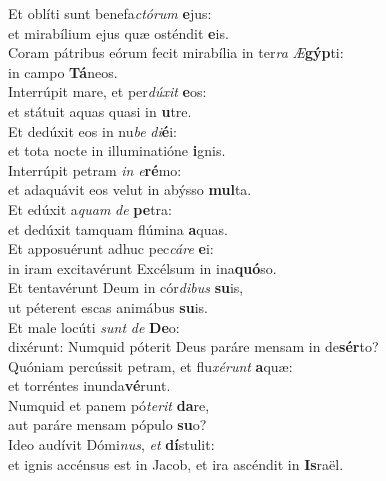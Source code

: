 \evenverse Et oblíti sunt benefa\textit{ctó}\textit{rum} \textbf{e}jus:~\*\\
\evenverse et mirabílium ejus quæ osténdit \textbf{e}is.\\
\oddverse Coram pátribus eórum fecit mirabília in ter\textit{ra} \textit{Æ}\textbf{gýp}ti:~\*\\
\oddverse in campo \textbf{Tá}neos.\\
\evenverse Interrúpit mare, et per\textit{dú}\textit{xit} \textbf{e}os:~\*\\
\evenverse et státuit aquas quasi in \textbf{u}tre.\\
\oddverse Et dedúxit eos in nu\textit{be} \textit{di}\textbf{é}i:~\*\\
\oddverse et tota nocte in illuminatióne \textbf{i}gnis.\\
\evenverse Interrúpit petram \textit{in} \textit{e}\textbf{ré}mo:~\*\\
\evenverse et adaquávit eos velut in abýsso \textbf{mul}ta.\\
\oddverse Et edúxit a\textit{quam} \textit{de} \textbf{pe}tra:~\*\\
\oddverse et dedúxit tamquam flúmina \textbf{a}quas.\\
\evenverse Et apposuérunt adhuc pec\textit{cá}\textit{re} \textbf{e}i:~\*\\
\evenverse in iram excitavérunt Excélsum in ina\textbf{quó}so.\\
\oddverse Et tentavérunt Deum in cór\textit{di}\textit{bus} \textbf{su}is,~\*\\
\oddverse ut péterent escas animábus \textbf{su}is.\\
\evenverse Et male locúti \textit{sunt} \textit{de} \textbf{De}o:~\*\\
\evenverse dixérunt: Numquid póterit Deus paráre mensam in de\textbf{sér}to?\\
\oddverse Quóniam percússit petram, et flu\textit{xé}\textit{runt} \textbf{a}quæ:~\*\\
\oddverse et torréntes inunda\textbf{vé}runt.\\
\evenverse Numquid et panem pó\textit{te}\textit{rit} \textbf{da}re,~\*\\
\evenverse aut paráre mensam pópulo \textbf{su}o?\\
\oddverse Ideo audívit Dómi\textit{nus}, \textit{et} \textbf{dí}stulit:~\*\\
\oddverse et ignis accénsus est in Jacob, et ira ascéndit in \textbf{Is}raël.\\
